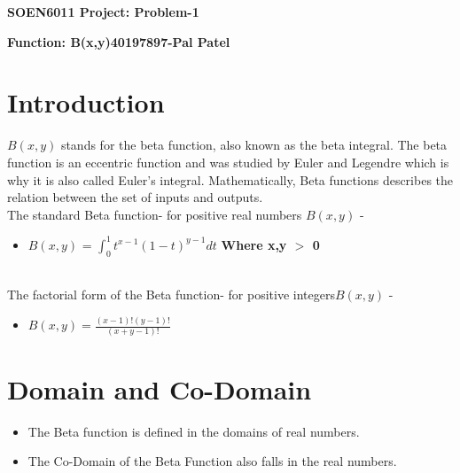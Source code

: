 \documentclass{article}
\begin{document}
\begin{center}\Large\textbf{SOEN6011 Project: Problem-1}\end{center}
\begin{center}\author{Pal Patel}\end{center}

\begin{flushleft}\Large\textbf{Function: B(x,y)}\hfill\textbf{40197897-Pal Patel}\end{flushleft}

\section{Introduction}
    $B(x,y)$ stands for the beta function, also known as the beta integral. The beta function is an eccentric function and was studied by Euler and Legendre which is why it is also called Euler's integral. Mathematically, Beta functions describes the relation between the set of inputs and outputs.\\ 
\noindent The standard Beta function- for positive real numbers \textbf{$B(x,y)$} \cite{gammabeta}-
    \begin{itemize}
        \item $B(x,y)$ = $\int_{0}^{1} {t^{x-1}}{(1-t)^{y-1}}dt$ \textbf{Where x,y $>$ 0} 
    \end{itemize}\\
    
\noindent The factorial form of the Beta function- for positive integers\textbf{$B(x,y)$} \cite{collegedunia}-
    \begin{itemize}
        \item $B(x,y) = \frac{(x-1)! (y-1)!}{(x+y-1)!}$ 
    \end{itemize}
    
\section{Domain and Co-Domain}
    \begin{itemize}
        \item The Beta function is defined in the domains of real numbers.
        \item The Co-Domain of the Beta Function also falls in the real numbers.
    \end{itemize}
    
\end{document}
